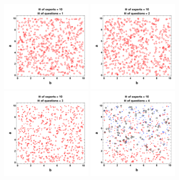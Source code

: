 \documentclass[preprintnumbers,aps,prd,floatfix,nofootinbib,onecolumn]{revtex4}
\begin{document}
\begin{figure}[]
	\centering
	\includegraphics[width=0.4\textwidth]{../phase_try_red_q-1_1.pdf}
	\includegraphics[width=0.4\textwidth]{../phase_try_red_q-2_1.pdf}
	\includegraphics[width=0.4\textwidth]{../phase_try_red_q-3_1.pdf}
	\includegraphics[width=0.4\textwidth]{../phase_try_red_q-4_1.pdf}
\end{figure}
\end{document}

